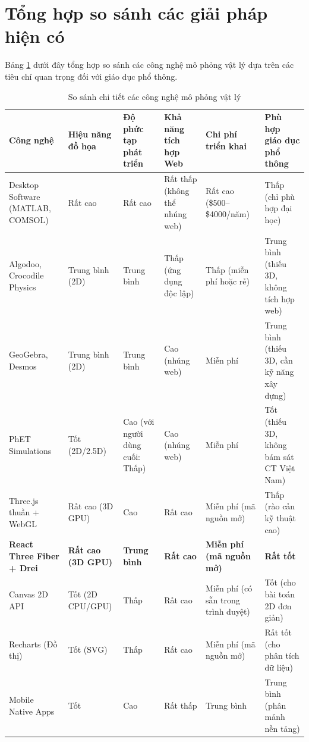 \section{Tổng hợp so sánh các giải pháp hiện có}

Bảng \ref{table:tech-comparison} dưới đây tổng hợp so sánh các công nghệ mô phỏng vật lý dựa trên các tiêu chí quan trọng đối với giáo dục phổ thông.

\begin{table}[H]
\centering
\caption{So sánh chi tiết các công nghệ mô phỏng vật lý}
\label{table:tech-comparison}
\begin{tabular}{|p{}|p{}|p{}|p{}|p{}|p{}|}
\hline
\textbf{Công nghệ} & \textbf{Hiệu năng đồ họa} & \textbf{Độ phức tạp phát triển} & \textbf{Khả năng tích hợp Web} & \textbf{Chi phí triển khai} & \textbf{Phù hợp giáo dục phổ thông} \\
\hline
Desktop Software (MATLAB, COMSOL) & Rất cao & Rất cao & Rất thấp (không thể nhúng web) & Rất cao (\$500–\$4000/năm) & Thấp (chỉ phù hợp đại học) \\
\hline
Algodoo, Crocodile Physics & Trung bình (2D) & Trung bình & Thấp (ứng dụng độc lập) & Thấp (miễn phí hoặc rẻ) & Trung bình (thiếu 3D, không tích hợp web) \\
\hline
GeoGebra, Desmos & Trung bình (2D) & Trung bình & Cao (nhúng web) & Miễn phí & Trung bình (thiếu 3D, cần kỹ năng xây dựng) \\
\hline
PhET Simulations & Tốt (2D/2.5D) & Cao (với người dùng cuối: Thấp) & Cao (nhúng web) & Miễn phí & Tốt (thiếu 3D, không bám sát CT Việt Nam) \\
\hline
Three.js thuần + WebGL & Rất cao (3D GPU) & Cao & Rất cao & Miễn phí (mã nguồn mở) & Thấp (rào cản kỹ thuật cao) \\
\hline
\textbf{React Three Fiber + Drei} & \textbf{Rất cao (3D GPU)} & \textbf{Trung bình} & \textbf{Rất cao} & \textbf{Miễn phí (mã nguồn mở)} & \textbf{Rất tốt} \\
\hline
Canvas 2D API & Tốt (2D CPU/GPU) & Thấp & Rất cao & Miễn phí (có sẵn trong trình duyệt) & Tốt (cho bài toán 2D đơn giản) \\
\hline
Recharts (Đồ thị) & Tốt (SVG) & Thấp & Rất cao & Miễn phí (mã nguồn mở) & Rất tốt (cho phân tích dữ liệu) \\
\hline
Mobile Native Apps & Tốt & Cao & Rất thấp & Trung bình & Trung bình (phân mảnh nền tảng) \\
\hline
\end{tabular}
\end{table}

